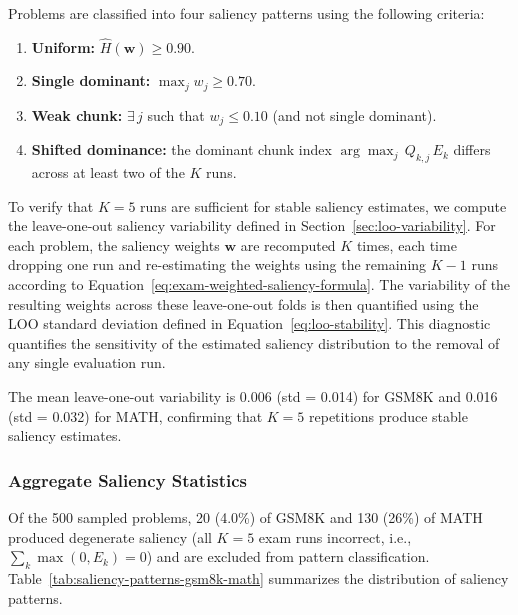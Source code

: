 \documentclass[12pt]{report}
\begin{document}
Problems are classified into four saliency patterns using the following
criteria:
\begin{enumerate}[nosep]
    \item \textbf{Uniform:} $\hat{H}(\mathbf{w}) \ge 0.90$.
    \item \textbf{Single dominant:} $\max_j w_j \ge 0.70$.
    \item \textbf{Weak chunk:}
          $\exists\, j$ such that $w_j \le 0.10$
          (and not single dominant).
    \item \textbf{Shifted dominance:}
          the dominant chunk index $\arg\max_j\, Q_{k,j}\,E_k$ differs
          across at least two of the $K$ runs.
\end{enumerate}
\bigskip
To verify that $K = 5$ runs are sufficient for stable saliency estimates,
we compute the leave-one-out saliency variability defined in
Section~\ref{sec:loo-variability}. For each problem, the saliency weights
$\mathbf{w}$ are recomputed $K$ times, each time dropping one run and
re-estimating the weights using the remaining $K-1$ runs according to
Equation~\ref{eq:exam-weighted-saliency-formula}. The variability of the
resulting weights across these leave-one-out folds is then quantified
using the LOO standard deviation defined in
Equation~\ref{eq:loo-stability}. This diagnostic quantifies the sensitivity of the estimated saliency distribution to the removal of any single evaluation run.

The mean leave-one-out variability is 0.006 (std = 0.014) for GSM8K and
0.016 (std = 0.032) for MATH, confirming that $K = 5$ repetitions produce
stable saliency estimates.

\subsubsection{Aggregate Saliency Statistics}
\label{sec:saliency-aggregate}

Of the 500 sampled problems, 20 (4.0\%) of GSM8K and 130 (26\%) of MATH produced degenerate saliency
(all $K=5$ exam runs incorrect, i.e., $\sum_k \max(0, E_k) = 0$) and
are excluded from pattern classification.
Table~\ref{tab:saliency-patterns-gsm8k-math} summarizes the distribution of saliency
patterns.
\end{document}
